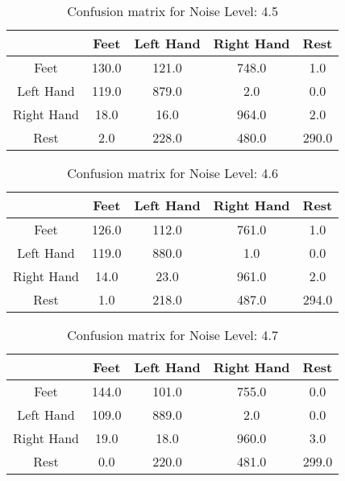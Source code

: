 \begin{table}[!htbp]
    \centering
    \begin{tabular}{|c||c|c|c|c|}
        \hline
		 & Feet & Left Hand & Right Hand & Rest \\
        \hline
        \hline
        Feet & 130.0 & 121.0 & 748.0 & 1.0 \\
        \hline
        Left Hand & 119.0 & 879.0 & 2.0 & 0.0 \\
        \hline
        Right Hand & 18.0 & 16.0 & 964.0 & 2.0 \\
        \hline
        Rest & 2.0 & 228.0 & 480.0 & 290.0 \\
        \hline
    \end{tabular}
    \caption{Confusion matrix for Noise Level: 4.5}
\end{table}

\begin{table}[!htbp]
    \centering
    \begin{tabular}{|c||c|c|c|c|}
        \hline
		 & Feet & Left Hand & Right Hand & Rest \\
        \hline
        \hline
        Feet & 126.0 & 112.0 & 761.0 & 1.0 \\
        \hline
        Left Hand & 119.0 & 880.0 & 1.0 & 0.0 \\
        \hline
        Right Hand & 14.0 & 23.0 & 961.0 & 2.0 \\
        \hline
        Rest & 1.0 & 218.0 & 487.0 & 294.0 \\
        \hline
    \end{tabular}
    \caption{Confusion matrix for Noise Level: 4.6}
\end{table}

\begin{table}[!htbp]
    \centering
    \begin{tabular}{|c||c|c|c|c|}
        \hline
		 & Feet & Left Hand & Right Hand & Rest \\
        \hline
        \hline
        Feet & 144.0 & 101.0 & 755.0 & 0.0 \\
        \hline
        Left Hand & 109.0 & 889.0 & 2.0 & 0.0 \\
        \hline
        Right Hand & 19.0 & 18.0 & 960.0 & 3.0 \\
        \hline
        Rest & 0.0 & 220.0 & 481.0 & 299.0 \\
        \hline
    \end{tabular}
    \caption{Confusion matrix for Noise Level: 4.7}
\end{table}

